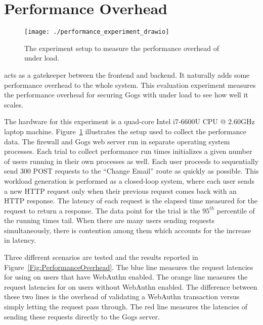 \section{Performance Overhead}\label{Sec:PerformanceOverhead}

\begin{figure}
  \centering
  \texttt{[image: ./performance\_experiment\_drawio]}
  \caption{The experiment setup to measure the performance overhead of \sys{} under load.}
  \label{Fig:PerformanceExperimentSetup}
\end{figure}

\sys{} acts as a gatekeeper between the frontend and backend. It naturally adds some performance overhead to the whole system. This evaluation experiment measures the performance overhead for securing Gogs with \sys{} under load to see how well it scales. 


The hardware for this experiment is a quad-core Intel i7-6600U CPU @ 2.60GHz laptop machine. Figure~\ref{Fig:PerformanceExperimentSetup} illustrates the setup used to collect the performance data. The firewall and Gogs web server run in separate operating system processes. Each trial to collect performance run times initializes a given number of users running in their own processes as well. Each user proceeds to sequentially send 300 POST requests to the ``Change Email'' route as quickly as possible. This workload generation is performed as a closed-loop system, where each user sends a new HTTP request only when their previous request comes back with an HTTP response. The latency of each request is the elapsed time measured for the request to return a response. The data point for the trial is the $95^{th}$ percentile of the running times tail. When there are many users sending requests simultaneously, there is contention among them which accounts for the increase in latency.

Three different scenarios are tested and the results reported in Figure~\ref{Fig:PerformanceOverhead}. The blue line measures the request latencies for using \sys{} on users that have WebAuthn enabled. The orange line measures the request latencies for \sys{} on users without WebAuthn enabled. The difference between these two lines is the overhead of validating a WebAuthn transaction versus simply letting the request pass through. The red line measures the latencies of sending these requests directly to the Gogs server.

